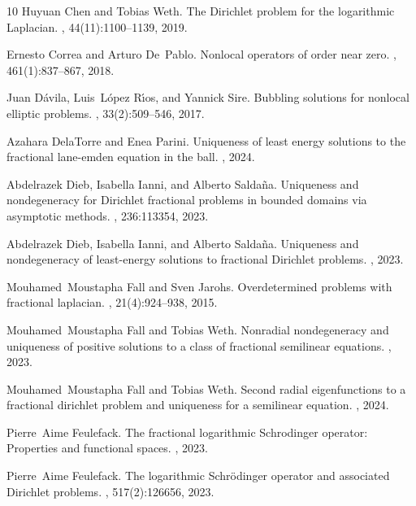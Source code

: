 \documentclass[11pt]{article}
\numberwithin{equation}{section}
\begin{document}
\begin{thebibliography}{10}
Huyuan Chen and Tobias Weth.
\newblock The {D}irichlet problem for the logarithmic {L}aplacian.
, 44(11):1100--1139, 2019.

Ernesto Correa and Arturo De~Pablo.
\newblock Nonlocal operators of order near zero.
,
  461(1):837--867, 2018.

Juan D{\'a}vila, Luis~L{\'o}pez R{\'\i}os, and Yannick Sire.
\newblock Bubbling solutions for nonlocal elliptic problems.
, 33(2):509--546, 2017.

Azahara DelaTorre and Enea Parini.
\newblock Uniqueness of least energy solutions to the fractional lane-emden
  equation in the ball.
, 2024.

Abdelrazek Dieb, Isabella Ianni, and Alberto Salda{\~n}a.
\newblock Uniqueness and nondegeneracy for {D}irichlet fractional problems in
  bounded domains via asymptotic methods.
, 236:113354, 2023.

Abdelrazek Dieb, Isabella Ianni, and Alberto Salda{\~n}a.
\newblock Uniqueness and nondegeneracy of least-energy solutions to fractional
  {D}irichlet problems.
, 2023.

Mouhamed~Moustapha Fall and Sven Jarohs.
\newblock Overdetermined problems with fractional laplacian.
,
  21(4):924--938, 2015.

Mouhamed~Moustapha Fall and Tobias Weth.
\newblock Nonradial nondegeneracy and uniqueness of positive solutions to a
  class of fractional semilinear equations.
, 2023.

Mouhamed~Moustapha Fall and Tobias Weth.
\newblock Second radial eigenfunctions to a fractional dirichlet problem and
  uniqueness for a semilinear equation.
, 2024.

Pierre~Aime Feulefack.
\newblock The fractional logarithmic {S}chrodinger operator: Properties and
  functional spaces.
, 2023.

Pierre~Aime Feulefack.
\newblock The logarithmic {S}chr{\"o}dinger operator and associated {D}irichlet
  problems.
,
  517(2):126656, 2023.


\end{thebibliography}
\end{document}
